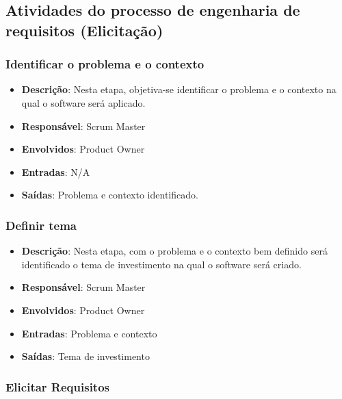 \subsection{Atividades do processo de engenharia de requisitos (Elicitação)}

\subsubsection{Identificar o problema e o contexto}

\begin{itemize}
  \item \textbf{Descrição}: Nesta etapa, objetiva-se identificar o problema e o contexto na qual o software será aplicado.
  \item \textbf{Responsável}: Scrum Master
  \item \textbf{Envolvidos}: Product Owner
  \item \textbf{Entradas}: N/A
  \item \textbf{Saídas}: Problema e contexto identificado.
\end{itemize}

\subsubsection{Definir tema}

\begin{itemize}
  \item \textbf{Descrição}: Nesta etapa, com o problema e o contexto bem definido será identificado o tema de investimento na qual o software será criado.
  \item \textbf{Responsável}: Scrum Master
  \item \textbf{Envolvidos}: Product Owner
  \item \textbf{Entradas}: Problema e contexto
  \item \textbf{Saídas}: Tema de investimento
\end{itemize}

\subsubsection{Elicitar Requisitos}

